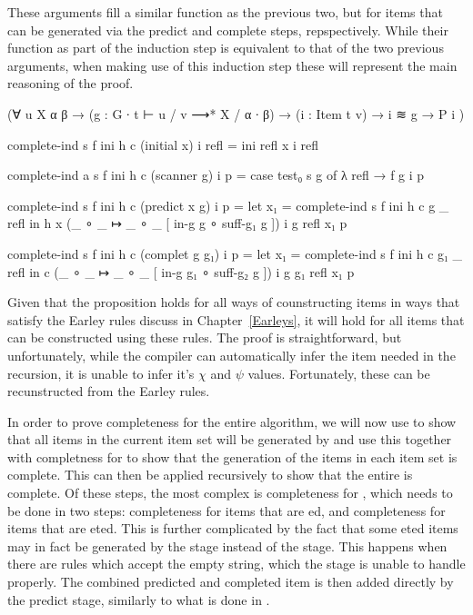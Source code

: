 		These arguments fill a similar function as the previous two, but for
		items that can be generated via the predict and complete steps,
		repspectively. While their function as part of the induction step is
		equivalent to that of the two previous arguments, when making use of
		this induction step these will represent the main reasoning of the
		proof.

		\begin{code}
			  (∀ {u X α β} →
			    (g : G ∙ t ⊢ u / v ⟶* X / α ∙ β) →
			    (i : Item t v) →
			    i ≋ g →
			    P i
			  )

			complete-ind s f ini h c (initial x) i refl =
			  ini refl x i refl

			complete-ind {a} s f ini h c (scanner g) i p =
			  case test₀ s g of λ {refl → f g i p}

			complete-ind s f ini h c (predict x g) i p =
			  let x₁ = complete-ind s f ini h c g _ refl in
			  h x (_ ∘ _ ↦ _ ∘ _ [ in-g g ∘ suff-g₁ g ]) i g refl x₁ p

			complete-ind s f ini h c (complet g g₁) i p =
			  let x₁ = complete-ind s f ini h c g₁ _ refl in
			  c (_ ∘ _ ↦ _ ∘ _ [ in-g g₁ ∘ suff-g₂ g ]) i g g₁ refl x₁ p
		\end{code}

		Given that the proposition holds for all ways of counstructing items in
		ways that satisfy the Earley rules discuss in Chapter~\ref{Earleys}, it
		will hold for all items that can be constructed using these rules. The
		proof is straightforward, but unfortunately, while the compiler can
		automatically infer the item needed in the recursion, it is unable to
		infer it's $\chi$ and $\psi$ values. Fortunately, these can be
		recunstructed from the Earley rules.

		In order to prove completeness for the entire algorithm, we will now
		use  to show that all items in the current item
		set will be generated by  and use this together with
		completness for  to show that the generation of the items
		in each item set is complete. This can then be applied recursively to
		show that the entire  is complete. Of these steps, the
		most complex is completeness for , which needs to be
		done in two steps: completeness for items that are ed,
		and completeness for items that are eted. This is further
		complicated by the fact that some eted items may in fact
		be generated by the  stage instead of the
		 stage. This happens when there are rules which accept
		the empty string, which the  stage is unable to handle
		properly. The combined predicted and completed item is then added
		directly by the predict stage, similarly to what is done in
		\cite{aycock02}.

